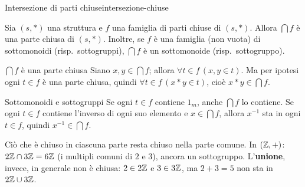 \begin{concetto}
\begin{Teorema}{Intersezione di parti chiuse}{intersezione-chiuse}
    \begin{prerequisiti}
    \end{prerequisiti}
    Sia $(s, *)$ una struttura e $f$ una famiglia di parti chiuse di $(s, *)$. Allora $\bigcap f$ è una parte chiusa di $(s, *)$.
    Inoltre, se $f$ è una famiglia (non vuota) di sottomonoidi (risp.\ sottogruppi), $\bigcap f$ è un sottomonoide (risp.\ sottogruppo).
\end{Teorema}
\begin{dimostrazione}
    \begin{caso}{$\bigcap f$ è una parte chiusa}
        Siano $x, y \in \bigcap f$; allora $\forall t \in f\,(x, y \in t)$. Ma per ipotesi ogni $t \in f$ è una parte chiusa, quindi
        $\forall t \in f\,(x * y \in t)$, cioè $x * y \in \bigcap f$.
    \end{caso}
    \begin{caso}{Sottomonoidi e sottogruppi}
        Se ogni $t \in f$ contiene $1_m$, anche $\bigcap f$ lo contiene. Se ogni $t \in f$ contiene l'inverso di ogni suo elemento e
        $x \in \bigcap f$, allora $x^{-1}$ sta in ogni $t \in f$, quindi $x^{-1} \in \bigcap f$.
    \end{caso}
\end{dimostrazione}
\end{concetto}

\begin{spiegazione}
    Ciò che è chiuso in ciascuna parte resta chiuso nella parte comune. In $(\mathbb{Z}, +)$: $2\mathbb{Z} \cap 3\mathbb{Z} = 6\mathbb{Z}$ (i multipli comuni di $2$ e $3$), ancora un sottogruppo.
    L'\textbf{unione}, invece, in generale non è chiusa: $2 \in 2\mathbb{Z}$ e $3 \in 3\mathbb{Z}$, ma $2 + 3 = 5$ non sta in $2\mathbb{Z} \cup 3\mathbb{Z}$.
\end{spiegazione}



